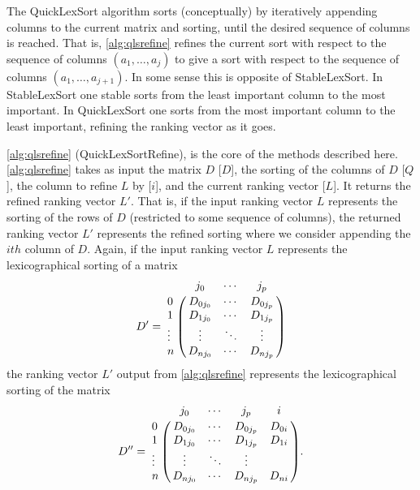 \documentclass[a4paper,10pt,reqno]{amsart}
\theoremstyle{definition}
\begin{document}
The QuickLexSort algorithm sorts (conceptually) by iteratively appending 
columns to the current matrix and sorting, until the desired sequence of columns is reached. That is,
\autoref{alg:qlsrefine} refines the current sort with respect to the sequence of columns
$(a_1,\ldots,a_j)$ to give a sort with respect to the sequence of columns
$(a_1,\ldots,a_{j+1})$. In some sense this is opposite of StableLexSort.  In
StableLexSort one stable sorts from the least important column to the most
important. In QuickLexSort one sorts from the most important column to the
least important, refining the ranking vector as it goes.

\autoref{alg:qlsrefine} (QuickLexSortRefine), is the core of the methods described here.
\autoref{alg:qlsrefine} takes as input the matrix $D$ [$D$], the sorting of the
columns of $D$ [$Q$], the column to refine $L$ by [$i$], and the
current ranking vector [$L$]. It returns the refined ranking vector $L'$. That
is, if the input ranking vector $L$ represents the sorting of the rows of $D$
(restricted to some sequence of columns), the returned ranking vector $L'$
represents the refined sorting where we consider appending the $ith$ column of
$D$. Again, if the input ranking vector $L$ represents the lexicographical
sorting of a matrix
\begin{equation*}
    D' = 
\bordermatrix{
  & j_0 & \cdots & j_p \cr
0 &   D_{0j_0} & \cdots & D_{0j_p} \cr
1 &   D_{1j_0} & \cdots & D_{1j_p} \cr
\vdots  & \vdots & \ddots & \vdots \cr
n &   D_{nj_0} & \cdots & D_{nj_p} }
\end{equation*}
the ranking vector $L'$ output from \autoref{alg:qlsrefine} represents the lexicographical sorting of the matrix
\begin{equation*}
D'' = 
\bordermatrix{
    & j_0 & \cdots & j_p & i\cr
  0 &   D_{0j_0} & \cdots & D_{0j_p} & D_{0i} \cr
1 &   D_{1j_0} & \cdots & D_{1j_p} & D_{1i}  \cr
\vdots  & \vdots & \ddots & \vdots \cr
n &   D_{nj_0} & \cdots & D_{nj_p} & D_{ni}  }.
\end{equation*}
\end{document}
